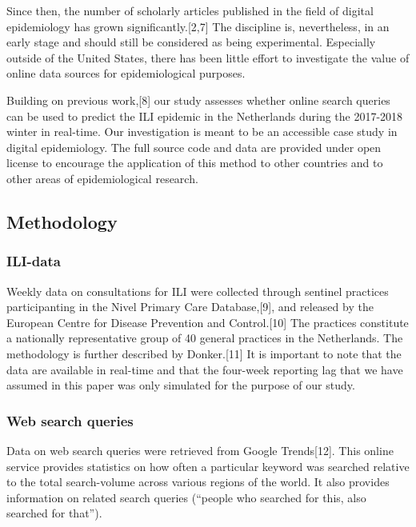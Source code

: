\documentclass[]{article}
\begin{document}
Since then, the number of scholarly articles published in the field of
digital epidemiology has grown significantly.{[}2,7{]} The discipline
is, nevertheless, in an early stage and should still be considered as
being experimental. Especially outside of the United States, there has
been little effort to investigate the value of online data sources for
epidemiological purposes.

Building on previous work,{[}8{]} our study assesses whether online
search queries can be used to predict the ILI epidemic in the
Netherlands during the 2017-2018 winter in real-time. Our investigation
is meant to be an accessible case study in digital epidemiology. The
full source code and data are provided under open license to encourage
the application of this method to other countries and to other areas of
epidemiological research.

\hypertarget{methodology}{%
\subsection{\texorpdfstring{\textbf{Methodology}}{Methodology}}\label{methodology}}

\hypertarget{ili-data}{%
\subsubsection{\texorpdfstring{\textbf{ILI-data}}{ILI-data}}\label{ili-data}}

Weekly data on consultations for ILI were collected through sentinel
practices participanting in the Nivel Primary Care Database,{[}9{]}, and
released by the European Centre for Disease Prevention and
Control.{[}10{]} The practices constitute a nationally representative
group of 40 general practices in the Netherlands. The methodology is
further described by Donker.{[}11{]} It is important to note that the
data are available in real-time and that the four-week reporting lag
that we have assumed in this paper was only simulated for the purpose of
our study.

\hypertarget{web-search-queries}{%
\subsubsection{\texorpdfstring{\textbf{Web search
queries}}{Web search queries}}\label{web-search-queries}}

Data on web search queries were retrieved from Google Trends{[}12{]}.
This online service provides statistics on how often a particular
keyword was searched relative to the total search-volume across various
regions of the world. It also provides information on related search
queries (``people who searched for this, also searched for that'').
\end{document}
